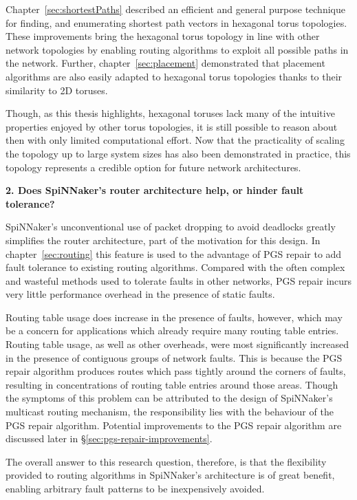 		Chapter~\ref{sec:shortestPaths} described an efficient and general purpose
		technique for finding, and enumerating shortest path vectors in hexagonal
		torus topologies. These improvements bring the hexagonal torus topology in
		line with other network topologies by enabling routing algorithms to
		exploit all possible paths in the network. Further,
		chapter~\ref{sec:placement} demonstrated that placement algorithms are also
		easily adapted to hexagonal torus topologies thanks to their similarity to
		2D toruses.
		
		Though, as this thesis highlights, hexagonal toruses lack many of the
		intuitive properties enjoyed by other torus topologies, it is still
		possible to reason about then with only limited computational effort.  Now
		that the practicality of scaling the topology up to large system sizes has
		also been demonstrated in practice, this topology represents a credible
		option for future network architectures.
		
		\vspace*{1.0em}
		\noindent%
		\textbf{2. Does SpiNNaker's router architecture help, or hinder fault
		tolerance?}
		
		SpiNNaker's unconventional use of packet dropping to avoid deadlocks
		greatly simplifies the router architecture, part of the motivation for this
		design. In chapter~\ref{sec:routing} this feature is used to the advantage
		of PGS repair to add fault tolerance to existing routing algorithms.
		Compared with the often complex and wasteful methods used to tolerate
		faults in other networks, PGS repair incurs very little performance
		overhead in the presence of static faults.
		
		Routing table usage does increase in the presence of faults, however, which
		may be a concern for applications which already require many routing table
		entries. Routing table usage, as well as other overheads, were most
		significantly increased in the presence of contiguous groups of network
		faults. This is because the PGS repair algorithm produces routes which pass
		tightly around the corners of faults, resulting in concentrations of
		routing table entries around those areas.  Though the symptoms of this
		problem can be attributed to the design of SpiNNaker's multicast routing
		mechanism, the responsibility lies with the behaviour of the PGS repair
		algorithm.  Potential improvements to the PGS repair algorithm are
		discussed later in \S\ref{sec:pgs-repair-improvements}.
		
		The overall answer to this research question, therefore, is that the
		flexibility provided to routing algorithms in SpiNNaker's architecture is
		of great benefit, enabling arbitrary fault patterns to be inexpensively
		avoided.
		
